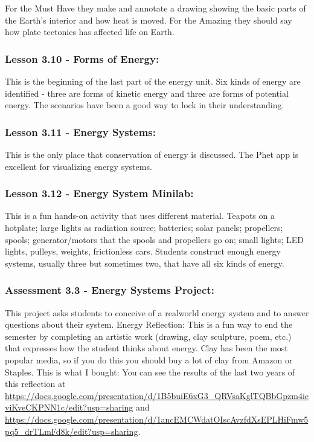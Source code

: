 \documentclass[11pt]{article}
\begin{document}
For the Must Have they make and annotate a drawing showing the basic parts of the Earth’s interior and how heat is moved. For the Amazing they
should say how plate tectonics has affected life on Earth.


\subsubsection{Lesson 3.10 - Forms of Energy:}
\label{sec:orgb99bbbe}

This is the beginning of the last part of the energy unit. Six kinds of energy are identified - three are forms of kinetic energy and three are forms
of potential energy. The scenarios have been a good way to lock in their understanding.


\subsubsection{Lesson 3.11 - Energy Systems:}
\label{sec:orgf46ca67}

This is the only place that conservation of energy is
discussed. The Phet app is excellent for visualizing energy systems.


\subsubsection{Lesson 3.12 - Energy System Minilab:}
\label{sec:org9837d0a}

This is a fun hands-on activity that uses different
material. Teapots on a hotplate; large lights as radiation source; batteries; solar panels;
propellers; spools; generator/motors that the spools and propellers go on; small lights;
LED lights, pulleys, weights, frictionless cars. Students construct enough energy
systems, usually three but sometimes two, that have all six kinds of energy.


\subsubsection{Assessment 3.3 - Energy Systems Project:}
\label{sec:orgd162839}

This project asks students to conceive of a realworld energy system and to answer questions about their system.
Energy Reflection: This is a fun way to end the semester by completing an artistic work
(drawing, clay sculpture, poem, etc.) that expresses how the student thinks about energy. Clay
has been the most popular media, so if you do this you should buy a lot of clay from Amazon or
Staples. This is what I bought:
You can see the results of the last two years of this reflection at
\url{https://docs.google.com/presentation/d/1B5buiE6xG3\_QRVsaKglTQBbGpzm4ieviKveCKPNN1c/edit?usp=sharing} and
\url{https://docs.google.com/presentation/d/1ancEMCWdatOIscAvzfdXsEPLHiFmw5pq5\_drTLmFd8k/edit?usp=sharing}.
\end{document}
